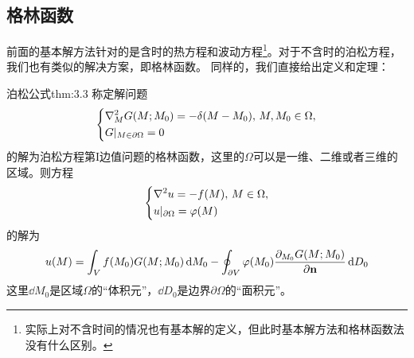 \subsection{格林函数}
前面的基本解方法针对的是含时的热方程和波动方程\footnote{实际上对不含时间的情况也有基本解的定义，但此时基本解方法和格林函数法没有什么区别。}。对于不含时的泊松方程，我们也有类似的解决方案，即格林函数。
同样的，我们直接给出定义和定理：
\begin{theorem}{泊松公式}{thm:3.3}
    称定解问题
    \begin{equation*}
        \left\{
            \begin{aligned}
                &\laplacian_{M}{G(M;M_0)} = -\delta(M - M_0),\, M, M_0 \in \Omega,\\
                &G|_{M \in \partial \Omega} = 0
            \end{aligned}
        \right.
    \end{equation*}
    的解为泊松方程第I边值问题的格林函数，这里的$\Omega$可以是一维、二维或者三维的区域。则方程
    \begin{equation*}
        \left\{
            \begin{aligned}
                &\laplacian{u} = -f(M),\, M \in \Omega,\\
                &u|_{\partial \Omega} = \varphi(M)
            \end{aligned}
        \right.
    \end{equation*}
    的解为
    \[u(M) = \int_{V} f(M_0)G(M;M_0) \dd{M_0} - \oint_{\partial V} \varphi(M_0) \pdv{_{M_0}G(M;M_0)}{\vb{n}} \dd{D_0}\]
    这里$\dd{M_0}$是区域$\Omega$的“体积元”，$\dd{D_0}$是边界$\partial \Omega$的“面积元”。
\end{theorem}